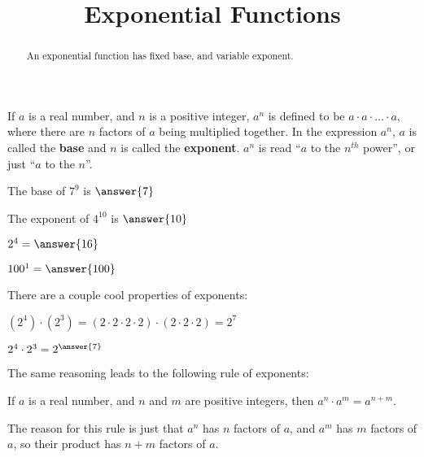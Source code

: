 \documentclass{ximera}
\title{Exponential Functions}
\begin{document}
\begin{abstract}
	An exponential function has fixed base, and variable exponent.
\end{abstract}

\maketitle

\begin{definition}
	If $a$ is a real number, and $n$ is a positive integer, $a^n$ is defined to be $a \cdot a \cdot ... \cdot a$, where there are $n$ factors of $a$ being multiplied together.  In the expression $a^n$, $a$ is called the \textbf{base} and $n$ is called the \textbf{exponent}.  $a^n$ is read ``$a$ to the $n^{th}$ power'', or just ``$a$ to the $n$''.
\end{definition}

\begin{question}
	The base of $7^9$ is $\answer{7}$
\end{question}

\begin{question}
	The exponent of $4^{10}$ is $\answer{10}$
\end{question}

\begin{question}
	$2^4 = \answer{16}$
\end{question}

\begin{question}
	$100^1= \answer{100}$
\end{question}

There are a couple cool properties of exponents:

\begin{question}
	\begin{hint}
		$(2^4) \cdot (2^3) = (2 \cdot 2\cdot 2 \cdot 2) \cdot  (2 \cdot 2\cdot 2) = 2^7 $
	\end{hint}

	$2^4 \cdot 2^3 = 2^{\answer{7}}$
\end{question}

The same reasoning leads to the following rule of exponents:

\begin{theorem}
	If $a$ is a real number, and $n$ and $m$ are positive integers, then $a^n \cdot a^m = a^{n+m}$.
\end{theorem}

The reason for this rule is just that $a^n$ has $n$ factors of $a$, and $a^m$ has $m$ factors of $a$, so their product has $n+m$ factors of $a$.
\end{document}
